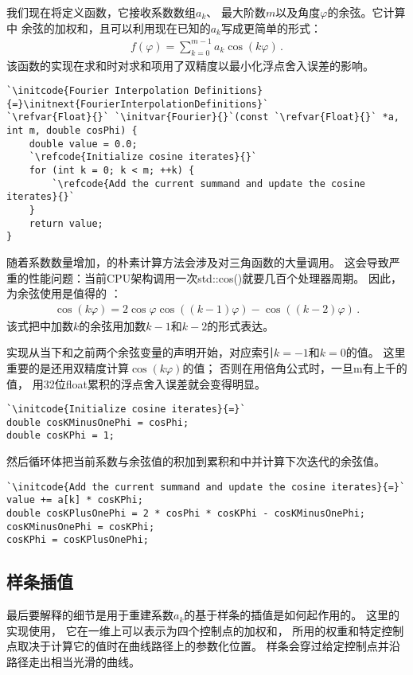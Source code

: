 我们现在将定义函数，它接收系数数组$a_k$、
最大阶数$m$以及角度$\varphi$的余弦。它计算中
余弦的加权和，且可以利用现在已知的$a_k$写成更简单的形式：
\begin{align}\label{eq:8.23}
    f(\varphi)=\sum\limits_{k=0}^{m-1}a_k\cos(k\varphi)\, .
\end{align}
该函数的实现在求和时对求和项用了双精度以最小化浮点舍入误差的影响。
\begin{lstlisting}
`\initcode{Fourier Interpolation Definitions}{=}\initnext{FourierInterpolationDefinitions}`
`\refvar{Float}{}` `\initvar{Fourier}{}`(const `\refvar{Float}{}` *a, int m, double cosPhi) {
    double value = 0.0;
    `\refcode{Initialize cosine iterates}{}`
    for (int k = 0; k < m; ++k) {
        `\refcode{Add the current summand and update the cosine iterates}{}`
    }
    return value;
}
\end{lstlisting}

随着系数数量增加，的朴素计算方法会涉及对三角函数的大量调用。
这会导致严重的性能问题：当前CPU架构调用一次{\ttfamily std::cos()}就要几百个处理器周期。
因此，为余弦使用是值得的
：
\begin{align}\label{eq:8.24}
    \cos(k\varphi)=2\cos\varphi\cos((k-1)\varphi)-\cos((k-2)\varphi)\, .
\end{align}
该式把中加数$k$的余弦用加数$k-1$和$k-2$的形式表达。

实现从当下和之前两个余弦变量的声明开始，对应索引$k=-1$和$k=0$的值。
这里重要的是还用双精度计算$\cos(k\varphi)$的值；
否则在用倍角公式时，一旦{\ttfamily m}有上千的值，
用32位{\ttfamily float}累积的浮点舍入误差就会变得明显。
\begin{lstlisting}
`\initcode{Initialize cosine iterates}{=}`
double cosKMinusOnePhi = cosPhi;
double cosKPhi = 1;
\end{lstlisting}
然后循环体把当前系数与余弦值的积加到累积和中并计算下次迭代的余弦值。
\begin{lstlisting}
`\initcode{Add the current summand and update the cosine iterates}{=}`
value += a[k] * cosKPhi;
double cosKPlusOnePhi = 2 * cosPhi * cosKPhi - cosKMinusOnePhi;
cosKMinusOnePhi = cosKPhi;
cosKPhi = cosKPlusOnePhi;
\end{lstlisting}

\subsection{样条插值}\label{sub:样条插值}
最后要解释的细节是用于重建系数$a_k$的基于样条的插值是如何起作用的。
这里的实现使用，
它在一维上可以表示为四个控制点的加权和，
所用的权重和特定控制点取决于计算它的值时在曲线路径上的参数化位置。
样条会穿过给定控制点并沿路径走出相当光滑的曲线。

